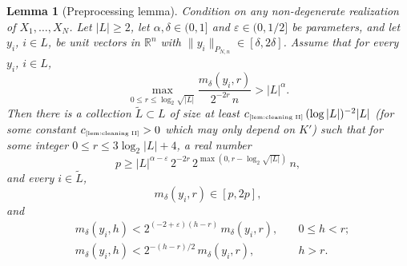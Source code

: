 \documentclass[11pt]{amsart}
\newtheorem{lemma}[theorem]{Lemma}
\theoremstyle{definition}
\theoremstyle{plain}
\newcommand{\R}{\mathbb{R}}
\def\R{{\mathbb R}}
\begin{document}
\begin{lemma}[Preprocessing lemma]\label{lem:cleaning II}
Condition on any non-degenerate realization of $X_1,\dots,X_N$.
Let $|L|\geq 2$,
let $\alpha,\delta\in(0,1]$ and $\varepsilon\in(0,1/2]$
be parameters,
and let $y_i$, $i\in L$, be
unit vectors in $\R^n$ with $\|y_i\|_{P_{N,n}}\in [\delta,2\delta]$.
Assume that 
for every $y_i$, $i\in L$,
$$
\max\limits_{0\leq r\leq \log_2 \sqrt{|L|}}
\frac{m_\delta(y_i,r)}{2^{-2r}\,n}
>
|L|^{\alpha}.
$$
Then there is a collection $\tilde L\subset L$
of size at least
$c_{\text{\tiny\ref{lem:cleaning II}}}\,(\log|L|)^{-2}|L|$
(for some constant
$c_{\text{\tiny\ref{lem:cleaning II}}}>0$
which may only depend on $K'$)
such that for 
some integer $0\leq r\leq 3\log_2|L|+4$,
a real number
$$p\geq 
|L|^{\alpha-\varepsilon}\,2^{-2r}\,
2^{\max(0,r-\log_2\sqrt{|L|})}\,n,$$ 
and
every $i\in\tilde L$,
$$
m_\delta(y_i,r)\in[p,2p],
$$
and
\begin{align*}
&m_\delta(y_i,h)
< 2^{(-2+\varepsilon)(h-r)}\,m_\delta(y_i,r),
\quad
&0\leq h< r;\\
&m_\delta(y_i,h)
< 2^{-(h-r)/2}\,m_\delta(y_i,r),
\quad
&h> r.
\end{align*}
\end{lemma}
\end{document}
